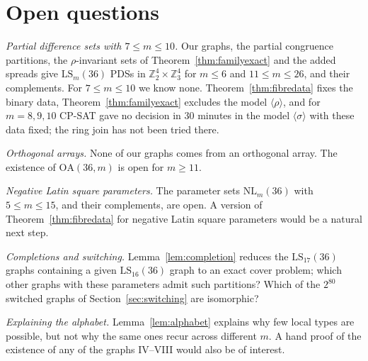 \documentclass[11pt]{amsart}
\theoremstyle{definition}
\newcommand{\Z}{\mathbb{Z}}
\newcommand{\LS}{\mathrm{LS}}
\newcommand{\NL}{\mathrm{NL}}
\begin{document}
\section{Open questions}\label{sec:open}
\emph{Partial difference sets with $7\le m\le10$.} Our graphs, the partial congruence partitions, the $\rho$-invariant sets of Theorem~\ref{thm:familyexact} and the added spreads give $\LS_m(36)$ PDSs in $\Z_2^4\times\Z_3^4$ for $m\le6$ and $11\le m\le26$, and their complements. For $7\le m\le10$ we know none. Theorem~\ref{thm:fibredata} fixes the binary data, Theorem~\ref{thm:familyexact} excludes the model $\langle\rho\rangle$, and for $m=8,9,10$ CP-SAT gave no decision in $30$ minutes in the model $\langle\sigma\rangle$ with these data fixed; the ring join has not been tried there.

\emph{Orthogonal arrays.} None of our graphs comes from an orthogonal array. The existence of $\mathrm{OA}(36,m)$ is open for $m\ge11$.

\emph{Negative Latin square parameters.} The parameter sets $\NL_m(36)$ with $5\le m\le15$, and their complements, are open. A version of Theorem~\ref{thm:fibredata} for negative Latin square parameters would be a natural next step.

\emph{Completions and switching.} Lemma~\ref{lem:completion} reduces the $\LS_{17}(36)$ graphs containing a given $\LS_{16}(36)$ graph to an exact cover problem; which other graphs with these parameters admit such partitions? Which of the $2^{80}$ switched graphs of Section~\ref{sec:switching} are isomorphic?

\emph{Explaining the alphabet.} Lemma~\ref{lem:alphabet} explains why few local types are possible, but not why the same ones recur across different $m$. A hand proof of the existence of any of the graphs IV--VIII would also be of interest.

\end{document}
